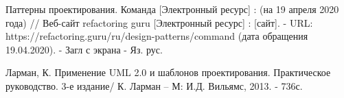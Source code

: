 \documentclass[14pt]{extreport}
\begin{document}
\begin{thebibliography}{9}
  Паттерны проектирования. Команда [Электронный ресурс] : (на 19 апреля 2020 года) // Веб-сайт refactoring guru [Электронный ресурс] : [сайт]. - URL: https://refactoring.guru/ru/design-patterns/command (дата обращения 19.04.2020). - Загл с экрана - Яз. рус.
  
  Ларман, К. Применение UML 2.0 и шаблонов проектирования. Практическое руководство. 3-е издание/ К. Ларман -- М: И.Д. Вильямс, 2013. - 736с.
  
  



  




  

\end{thebibliography}


\end{document}
